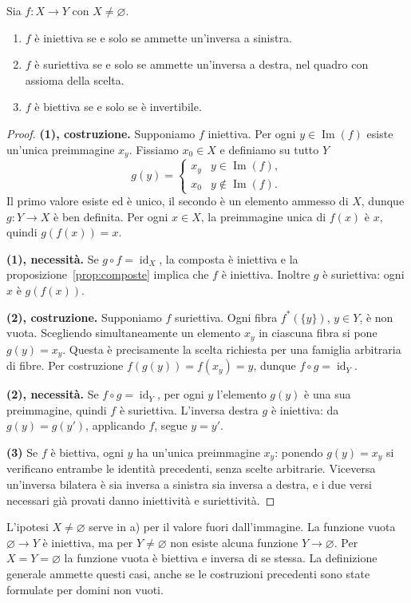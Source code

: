 \begin{teorema}\label{teo:inverse}
Sia $f:X\to Y$ con $X\ne\varnothing$.
\begin{enumerate}[label=\arabic*.]
\item $f$ è iniettiva se e solo se ammette un'inversa a sinistra.
\item $f$ è suriettiva se e solo se ammette un'inversa a destra, nel quadro con assioma della scelta.
\item $f$ è biettiva se e solo se è invertibile.
\end{enumerate}
\end{teorema}
\begin{proof}
\textbf{(1), costruzione.} Supponiamo $f$ iniettiva. Per ogni $y\in\operatorname{Im}(f)$ esiste un'unica preimmagine $x_y$. Fissiamo $x_0\in X$ e definiamo su tutto $Y$
\[
g(y)=\begin{cases}x_y&y\in\operatorname{Im}(f),\\x_0&y\notin\operatorname{Im}(f).\end{cases}
\]
Il primo valore esiste ed è unico, il secondo è un elemento ammesso di $X$, dunque $g:Y\to X$ è ben definita. Per ogni $x\in X$, la preimmagine unica di $f(x)$ è $x$, quindi $g(f(x))=x$.

\textbf{(1), necessità.} Se $g\circ f=\operatorname{id}_X$, la composta è iniettiva e la proposizione~\ref{prop:composte} implica che $f$ è iniettiva. Inoltre $g$ è suriettiva: ogni $x$ è $g(f(x))$.

\textbf{(2), costruzione.} Supponiamo $f$ suriettiva. Ogni fibra $f^*(\{y\})$, $y\in Y$, è non vuota. Scegliendo simultaneamente un elemento $x_y$ in ciascuna fibra si pone $g(y)=x_y$. Questa è precisamente la scelta richiesta per una famiglia arbitraria di fibre. Per costruzione $f(g(y))=f(x_y)=y$, dunque $f\circ g=\operatorname{id}_Y$.

\textbf{(2), necessità.} Se $f\circ g=\operatorname{id}_Y$, per ogni $y$ l'elemento $g(y)$ è una sua preimmagine, quindi $f$ è suriettiva. L'inversa destra $g$ è iniettiva: da $g(y)=g(y')$, applicando $f$, segue $y=y'$.

\textbf{(3)} Se $f$ è biettiva, ogni $y$ ha un'unica preimmagine $x_y$: ponendo $g(y)=x_y$ si verificano entrambe le identità precedenti, senza scelte arbitrarie. Viceversa un'inversa bilatera è sia inversa a sinistra sia inversa a destra, e i due versi necessari già provati danno iniettività e suriettività.
\end{proof}

\begin{osservazione}
L'ipotesi $X\ne\varnothing$ serve in a) per il valore fuori dall'immagine. La funzione vuota $\varnothing\to Y$ è iniettiva, ma per $Y\ne\varnothing$ non esiste alcuna funzione $Y\to\varnothing$. Per $X=Y=\varnothing$ la funzione vuota è biettiva e inversa di se stessa. La definizione generale ammette questi casi, anche se le costruzioni precedenti sono state formulate per domini non vuoti.
\end{osservazione}

